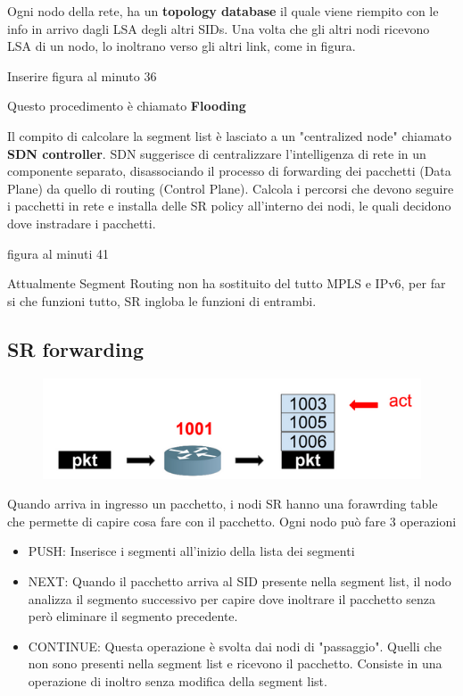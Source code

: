 \documentclass[12pt]{article}
\begin{document}
Ogni nodo della rete, ha un \textbf{topology database} il quale viene riempito con le info in arrivo dagli LSA degli altri SIDs.
Una volta che gli altri nodi ricevono LSA di un nodo, lo inoltrano verso gli altri link, come in figura. 

Inserire figura al minuto 36

Questo procedimento è chiamato \textbf{Flooding}

Il compito di calcolare la segment list è lasciato a un "centralized node" chiamato \textbf{SDN controller}. 
SDN suggerisce di centralizzare l'intelligenza di rete in un componente separato, disassociando il processo di forwarding dei pacchetti (Data Plane) da quello di routing (Control Plane). 
Calcola i percorsi che devono seguire i pacchetti in rete e installa delle SR policy all'interno dei nodi, le quali decidono dove instradare
i pacchetti. 

figura al minuti 41

Attualmente Segment Routing non ha sostituito del tutto MPLS e IPv6, per far si che funzioni tutto, SR ingloba 
le funzioni di entrambi. 

\subsection{SR forwarding}

\begin{figure}[h]
    \includegraphics*[scale = 0.3]{F5.png}
    \centering
\end{figure}

Quando arriva in ingresso un pacchetto, i nodi SR hanno una forawrding table che permette
di capire cosa fare con il pacchetto. 
Ogni nodo può fare 3 operazioni
\begin{itemize}
    \item PUSH: Inserisce i segmenti all'inizio della lista dei segmenti 
    \item NEXT: Quando il pacchetto arriva al SID presente nella segment list, il nodo analizza
    il segmento successivo per capire dove inoltrare il pacchetto senza però eliminare il segmento precedente. 
    \item CONTINUE: Questa operazione è svolta dai nodi di "passaggio". Quelli che non sono presenti
    nella segment list e ricevono il pacchetto. Consiste in una operazione di inoltro senza modifica della 
    segment list. 
\end{itemize}
\end{document}
